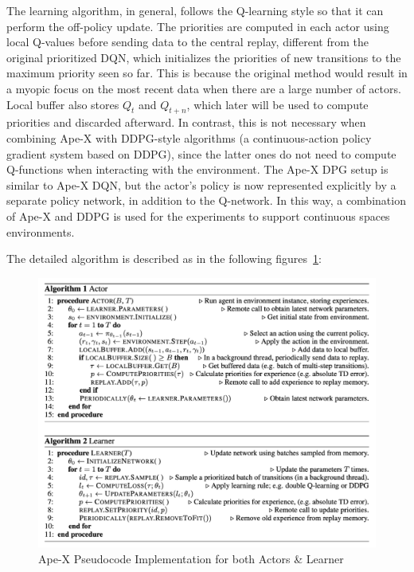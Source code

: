 The learning algorithm, in general, follows the Q-learning style so that it can perform the off-policy update. 
The priorities are computed in each actor using local Q-values before sending data to the central replay, different from the original prioritized DQN, which initializes the priorities of new transitions to the maximum priority seen so far. This is because the original method would result in a myopic focus on the most recent data when there are a large number of actors. Local buffer also stores \(Q_{t}\) and \(Q_{t+n}\), which later will be used to compute priorities and discarded afterward. In contrast, this is not necessary when combining Ape-X with DDPG-style algorithms (a continuous-action policy gradient system based on DDPG), since the latter ones do not need to compute Q-functions when interacting with the environment. The Ape-X DPG setup is similar to Ape-X DQN, but the actor’s policy is now represented explicitly by a separate policy network, in addition to the Q-network.
In this way, a combination of Ape-X and DDPG is used for the experiments to support continuous spaces environments.

The detailed algorithm is described as in the following figures~\ref{fig:apex_algorithm}:
\begin{figure}[!htb]
		\centering
		\includegraphics[width=\linewidth]{figures/apex.png}
		\caption{Ape-X Pseudocode Implementation for both Actors \& Learner}
		\label{fig:apex_algorithm}
\end{figure}